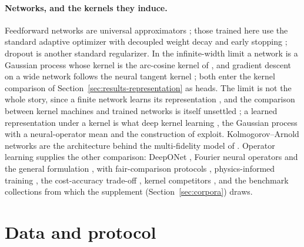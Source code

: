\documentclass[11pt]{article}
\newcommand{\1}{\mathbf{1}}
\begin{document}
\paragraph{Networks, and the kernels they induce.}
Feedforward networks are universal approximators \cite{hornik}; those trained here use the
standard adaptive optimizer \cite{adam} with decoupled weight decay \cite{adamw} and early
stopping \cite{prechelt}; dropout \cite{dropout} is another standard regularizer. In the
infinite-width limit a network is a Gaussian process \cite{neal,leenngp,matthews} whose kernel is
the arc-cosine kernel of \cite{chosaul}, and gradient descent on a wide network follows the neural
tangent kernel \cite{ntk,arora}; both enter the kernel comparison of
Section~\ref{sec:results-representation} as heads. The limit is not the whole story, since a
finite network learns its representation \cite{rfm}, and the comparison between kernel machines
and trained networks is itself unsettled \cite{belkin}; a learned representation under a kernel is
what deep kernel learning \cite{wilson}, the Gaussian process with a neural-operator mean
\cite{mora} and the construction of \cite{nmkc} exploit. Kolmogorov--Arnold networks
\cite{kolmogorov,kan} are the architecture behind the multi-fidelity model of \cite{pkan}.
Operator learning supplies the other comparison: DeepONet \cite{deeponet}, Fourier neural
operators \cite{fno} and the general formulation \cite{kovachki}, with fair-comparison protocols
\cite{lufair}, physics-informed training \cite{pinn}, the cost-accuracy trade-off \cite{dehoop},
kernel competitors \cite{batlle}, and the benchmark collections \cite{pdebench,thewell,climsim}
from which the supplement (Section~\ref{sec:corpora}) draws.

\section{Data and protocol}\label{sec:data}
\end{document}
